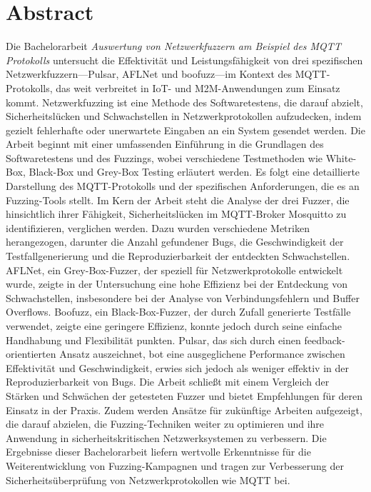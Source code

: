 \clearpage
{}
\pagestyle{empty}
\section*{Abstract}
Die Bachelorarbeit \textit{Auswertung von Netzwerkfuzzern am Beispiel des MQTT Protokolls} untersucht die Effektivität und Leistungsfähigkeit von drei spezifischen Netzwerkfuzzern—Pulsar, AFLNet
und boofuzz—im Kontext des MQTT-Protokolls, das weit verbreitet in IoT- und M2M-Anwendungen zum Einsatz kommt.
Netzwerkfuzzing ist eine Methode des Softwaretestens, die darauf abzielt, Sicherheitslücken und Schwachstellen in
Netzwerkprotokollen aufzudecken, indem gezielt fehlerhafte oder unerwartete Eingaben an ein System gesendet werden.
Die Arbeit beginnt mit einer umfassenden Einführung in die Grundlagen des Softwaretestens und des Fuzzings, wobei
verschiedene Testmethoden wie White-Box, Black-Box und Grey-Box Testing erläutert werden.
Es folgt eine detaillierte Darstellung des MQTT-Protokolls und der spezifischen Anforderungen, die es an Fuzzing-Tools stellt.\newline\newline
Im Kern der Arbeit steht die Analyse der drei Fuzzer, die hinsichtlich ihrer Fähigkeit, Sicherheitslücken im MQTT-Broker
Mosquitto zu identifizieren, verglichen werden.
Dazu wurden verschiedene Metriken herangezogen, darunter die Anzahl gefundener Bugs, die Geschwindigkeit der Testfallgenerierung
und die Reproduzierbarkeit der entdeckten Schwachstellen.
AFLNet, ein Grey-Box-Fuzzer, der speziell für Netzwerkprotokolle entwickelt wurde, zeigte in der Untersuchung eine hohe
Effizienz bei der Entdeckung von Schwachstellen, insbesondere bei der Analyse von Verbindungsfehlern und Buffer Overflows.
Boofuzz, ein Black-Box-Fuzzer, der durch Zufall generierte Testfälle verwendet, zeigte eine geringere Effizienz, konnte
jedoch durch seine einfache Handhabung und Flexibilität punkten.
Pulsar, das sich durch einen feedback-orientierten Ansatz auszeichnet, bot eine ausgeglichene Performance zwischen Effektivität
und Geschwindigkeit, erwies sich jedoch als weniger effektiv in der Reproduzierbarkeit von Bugs.\newline\newline
Die Arbeit schließt mit einem Vergleich der Stärken und Schwächen der getesteten Fuzzer und bietet Empfehlungen für deren
Einsatz in der Praxis.
Zudem werden Ansätze für zukünftige Arbeiten aufgezeigt, die darauf abzielen, die Fuzzing-Techniken weiter zu optimieren
und ihre Anwendung in sicherheitskritischen Netzwerksystemen zu verbessern.
Die Ergebnisse dieser Bachelorarbeit liefern wertvolle Erkenntnisse für die Weiterentwicklung von Fuzzing-Kampagnen und tragen
zur Verbesserung der Sicherheitsüberprüfung von Netzwerkprotokollen wie MQTT bei.
\restoregeometry